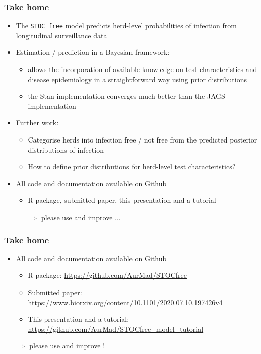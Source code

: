 \documentclass{beamer}
\begin{document}
\begin{frame}
\frametitle{Take home}
 \begin{itemize}
  \item{The \texttt{STOC free} model predicts herd-level probabilities of infection from longitudinal surveillance data}
  \item<2->{Estimation / prediction in a Bayesian framework:}
  \begin{itemize}
   \item{allows the incorporation of available knowledge on test characteristics and disease epidemiology in a straightforward way using prior distributions}
   \item{the Stan implementation converges much better than the JAGS implementation}
  \end{itemize}
  \item<3->{Further work:}
  \begin{itemize}
   \item{Categorise herds into infection free / not free from the predicted posterior distributions of infection}
   \item{How to define prior distributions for herd-level test characteristics?}
  \end{itemize}
  \item<4->{All code and documentation available on Github}
  \begin{itemize}
   \item{R package, submitted paper, this presentation and a tutorial}
   \item[$\Rightarrow$]{please use and improve $\ldots$}
  \end{itemize}
 \end{itemize}
\end{frame}

\begin{frame}
\frametitle{Take home}
\begin{itemize}
  \item{All code and documentation available on Github}
  \begin{itemize}
   \item{R package: \url{https://github.com/AurMad/STOCfree}}
   \item{Submitted paper: \url{https://www.biorxiv.org/content/10.1101/2020.07.10.197426v4}}
   \item{This presentation and a tutorial: \url{https://github.com/AurMad/STOCfree_model_tutorial}}
  \end{itemize}
   \item[$\Rightarrow$]{please use and improve !}
 \end{itemize}
\end{frame}
\end{document}
